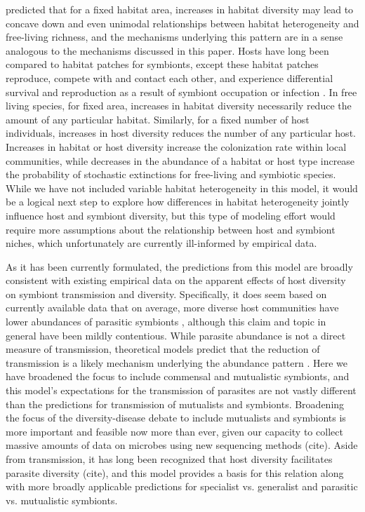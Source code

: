 \documentclass[12pt]{article}
\begin{document}
\cite{Allouche2012} predicted that for a fixed habitat area, increases in habitat diversity may lead to concave down and even unimodal relationships between habitat heterogeneity and free-living richness, and the mechanisms underlying this pattern are in a sense analogous to the mechanisms discussed in this paper. 
Hosts have long been compared to habitat patches for symbionts, except these habitat patches reproduce, compete with and contact each other, and experience differential survival and reproduction as a result of symbiont occupation or infection \citep{Kuris1980, Mihaljevic2012}. 
In free living species, for fixed area, increases in habitat diversity necessarily reduce the amount of any particular habitat. 
Similarly, for a fixed number of host individuals, increases in host diversity reduces the number of any particular host. 
Increases in habitat or host diversity increase the colonization rate within local communities, while decreases in the abundance of a habitat or host type increase the probability of stochastic extinctions for free-living and symbiotic species. 
While we have not included variable habitat heterogeneity in this model, it would be a logical next step to explore how differences in habitat heterogeneity jointly influence host and symbiont diversity, but this type of modeling effort would require more assumptions about the relationship between host and symbiont niches, which unfortunately are currently ill-informed by empirical data. 

As it has been currently formulated, the predictions from this model are broadly consistent with existing empirical data on the apparent effects of host diversity on symbiont transmission and diversity.
Specifically, it does seem based on currently available data that on average, more diverse host communities have lower abundances of parasitic symbionts \citep{Civitello2015}, although this claim and topic in general have been mildly contentious. 
While parasite abundance is not a direct measure of transmission, theoretical models predict that the reduction of transmission is a likely mechanism underlying the abundance pattern \citep{Dobson2004a, Rudolf2005, Mihaljevic2014}.
Here we have broadened the focus to include commensal and mutualistic symbionts, and this model's expectations for the transmission of parasites are not vastly different than the predictions for transmission of mutualists and symbionts. 
Broadening the focus of the diversity-disease debate to include mutualists and symbionts is more important and feasible now more than ever, given our capacity to collect massive amounts of data on microbes using new sequencing methods (cite). 
Aside from transmission, it has long been recognized that host diversity facilitates parasite diversity (cite), and this model provides a basis for this relation along with more broadly applicable predictions for specialist vs. generalist and parasitic vs. mutualistic symbionts. 
\end{document}
